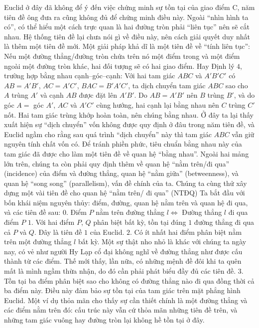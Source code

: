 \begin{multicols}{2}
	\vskip 0.1cm
	Euclid ở đây đã không để ý đến việc chứng minh sự tồn tại của giao điểm C, năm
	tiên đề ông đưa ra cũng không đủ để chứng minh điều này. Ngoài ``nhìn hình ta có'', có thể hiểu một cách trực quan là hai đường tròn phải ``liên tục'' nên sẽ cắt nhau. Hệ thống tiên đề lại chưa nói gì về điều này, nên cách giải quyết duy nhất là thêm một tiên đề mới. Một giải pháp khả dĩ là một tiên đề về ``tính liên tục'':	
	\vskip 0.1cm
	Nếu một đường thẳng/đường tròn chứa trên nó một điểm trong và một điểm ngoài một đường tròn khác, hai đối tượng sẽ có hai giao điểm.
	\vskip 0.1cm
	Hay Định lý $4$, trường hợp bằng nhau cạnh--góc--cạnh: Với hai tam giác $ABC$ và $A'B'C'$ có $AB = A'B'$, $AC = A'C'$, $BAC = B'A'C'$, ta dịch chuyển tam giác $ABC$ sao cho $A$ trùng $A'$ và cạnh $AB$ được đặt lên $A'B'$. Do $AB = A'B'$ nên $B$ trùng $B'$, và do góc $A =$ góc $A'$, $AC$ và $A'C'$ cùng hướng, hai cạnh lại bằng nhau nên $C$ trùng $C'$ nốt. Hai tam giác trùng khớp hoàn toàn, nên chúng bằng nhau.
	\vskip 0.1cm
	Ở đây ta lại thấy xuất hiện sự ``dịch chuyển'' vốn không được quy định ở đâu trong năm tiên đề, và Euclid ngầm cho rằng sau quá trình ``dịch chuyển'' này thì tam giác $ABC$ vẫn giữ nguyên tính chất vốn có. Để tránh phiền phức, tiêu chuẩn bằng nhau này của tam giác đã được cho làm một tiên đề về quan hệ ``bằng nhau''.
	\vskip 0.1cm
	Ngoài hai mảng lớn trên, chúng ta còn phải quy định thêm về quan hệ ``nằm trên/đi qua'' (incidence) của điểm và đường thẳng, quan hệ ``nằm giữa'' (betweenness), và quan hệ ``song song'' (parallelism), vấn đề chính của ta. 
	Chúng ta cùng thử xây dựng một vài tiên đề cho quan hệ ``nằm trên/ đi qua'' (NTĐQ)
	\vskip 0.1cm
	Ta bắt đầu với bốn khái niệm nguyên thủy: điểm, đường, quan hệ nằm trên và quan hệ đi qua, và các tiên đề sau:
	\vskip 0.1cm
	$0.$ Điểm $P$ nằm trên đường thẳng $l \Leftrightarrow$ Đường thẳng $l$ đi qua điểm $P$
	\vskip 0.1cm
	$1.$ Với hai điểm $P$, $Q$ phân biệt bất kỳ, tồn tại đúng $1$ đường thẳng đi qua cả $P$ và $Q$. Đây là tiên đề $1$ của Euclid.
	\vskip 0.1cm
	$2.$ Có ít nhất hai điểm phân biệt nằm trên một đường thẳng $l$ bất kỳ. Một sự thật nho nhỏ là khác với chúng ta ngày nay, có vẻ như người Hy Lạp cổ đại không nghĩ về đường thẳng như được cấu thành từ các điểm. Thế mới thấy, lần nữa, có những mệnh đề đôi khi ta quên mất là mình ngầm thừa nhận, do đó cần phải phát biểu đầy đủ các tiên đề.
	\vskip 0.1cm
	$3.$ Tồn tại ba điểm phân biệt sao cho không có đường thẳng nào đi qua đồng thời cả ba điểm này. Điều này đảm bảo sự tồn tại của tam giác trên mặt phẳng hình Euclid. Một ví dụ thỏa mãn cho thấy sự cần thiết chính là một đường thẳng và các điểm nằm trên đó: cấu trúc này vẫn cứ thỏa mãn những tiên đề trên, và những tam giác vuông hay đường tròn lại không hề tồn tại ở đây.

\end{multicols}
